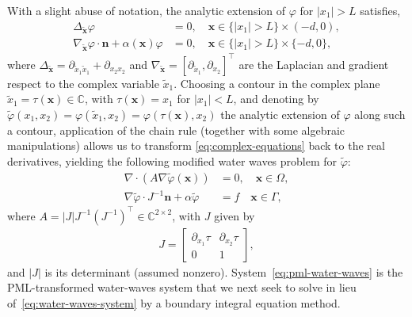 \documentclass[11pt]{article}
\newcommand{\C}{\mathbb{C}}
\newcommand{\bn}{\mathbf{n}}
\newcommand{\bx}{\mathbf{x}}
\newcommand{\tvarphi}{\tilde \varphi}
\begin{document}
With a slight abuse of notation, the analytic extension of $\varphi$ for $|x_1|
> L$ satisfies, 
\begin{subequations}
  \label{eq:complex-equations}  
  \begin{align}  
      \label{eq:pml-laplace-equation}
      \Delta_{\tilde{\bx}} \varphi &=0, \quad \bx \in \{|x_1| > L \} \times (-d,0),\\
      \label{eq:pml-bc1} 
      \nabla_{\tilde{\bx}} \varphi \cdot \bn + \alpha(\bx) \varphi &=0, \quad \bx \in \{|x_1| > L \} \times \{-d,0\},
  \end{align}
\end{subequations}
where $\Delta_{\tilde{\bx}} = \partial_{\tilde{x}_1 \tilde{x}_1} + \partial_{x_2
x_2}$ and $\nabla_{\tilde{\bx}} = \left[\partial_{\tilde{x}_1},\partial_{x_2}
\right]^\top$ are the Laplacian and gradient respect to the complex variable
$\tilde{x}_1$. Choosing a contour in the complex plane $\tilde{x}_1 = \tau(\bx)
\in \C$, with $\tau(\bx) = x_1$ for $|x_1| < L$, and denoting by
$\tvarphi(x_1,x_2) = \varphi(\tilde{x}_1,x_2) = \varphi(\tau(\bx),x_2)$ the
analytic extension of $\varphi$ along such a contour, application of the chain
rule (together with some algebraic manipulations) allows us to transform
\cref{eq:complex-equations} back to the real derivatives, yielding the following
modified water waves problem for $\tilde{\varphi}$:
\begin{subequations}
  \label{eq:pml-water-waves}  
  \begin{align}
      \label{eq:pml-laplace-real}
      \nabla \cdot \left( A \nabla \tvarphi(\bx) \right) &= 0, \quad \bx \in \Omega,\\
      \label{eq:pml-bc-real} 
      \nabla \tvarphi \cdot J^{-1}\bn + \alpha \tvarphi &= f \quad \bx \in \Gamma,
  \end{align}
\end{subequations}
where $A = |J|J^{-1}(J^{-1})^\top \in \C^{2 \times 2}$, with $J$ given by
\begin{align}
  J =   
  \begin{bmatrix}
    \partial_{x_1} \tau & \partial_{x_2} \tau\\
    0 & 1
  \end{bmatrix},
\end{align}
and $|J|$ is its determinant (assumed nonzero). System~\cref{eq:pml-water-waves}
is the PML-transformed water-waves system that we next seek to solve in lieu
of~\cref{eq:water-waves-system} by a boundary integral equation method. 
\end{document}
